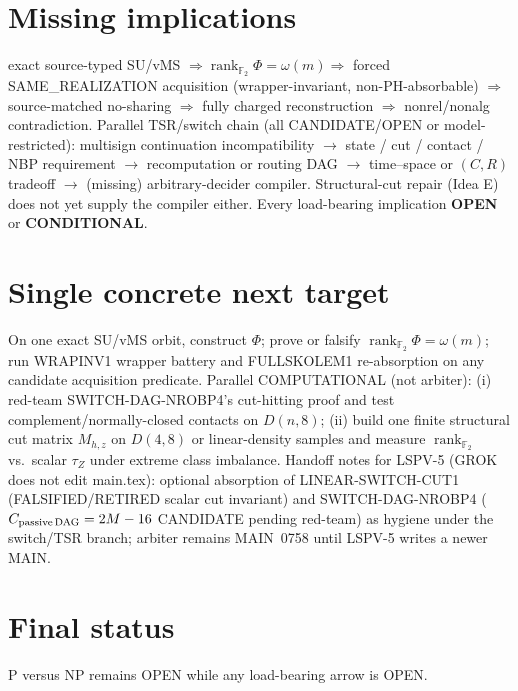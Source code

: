 \documentclass[11pt]{article}
\begin{document}
\section*{Missing implications}
exact source-typed SU/vMS $\Rightarrow\operatorname{rank}_{\mathbb F_2}\Phi=\omega(m)
\Rightarrow$ forced SAME\_REALIZATION acquisition (wrapper-invariant, non-PH-absorbable)
$\Rightarrow$ source-matched no-sharing $\Rightarrow$ fully charged reconstruction
$\Rightarrow$ nonrel/nonalg contradiction.
Parallel TSR/switch chain (all CANDIDATE/OPEN or model-restricted):
multisign continuation incompatibility $\to$ state / cut / contact / NBP requirement
$\to$ recomputation or routing DAG $\to$ time--space or $(C,R)$ tradeoff
$\to$ (missing) arbitrary-decider compiler.
Structural-cut repair (Idea E) does not yet supply the compiler either.
Every load-bearing implication \textbf{OPEN} or \textbf{CONDITIONAL}.

\section*{Single concrete next target}
On one exact SU/vMS orbit, construct $\Phi$; prove or falsify
$\boxed{\operatorname{rank}_{\mathbb F_2}\Phi=\omega(m)}$;
run WRAPINV1 wrapper battery and FULLSKOLEM1 re-absorption on any candidate acquisition predicate.
Parallel COMPUTATIONAL (not arbiter): (i) red-team SWITCH-DAG-NROBP4's cut-hitting proof and
test complement/normally-closed contacts on $D(n,8)$; (ii) build one finite structural cut
matrix $M_{h,z}$ on $D(4,8)$ or linear-density samples and measure $\operatorname{rank}_{\mathbb F_2}$
vs.\ scalar $\tau_Z$ under extreme class imbalance.
Handoff notes for LSPV-5 (GROK does not edit main.tex): optional absorption of
LINEAR-SWITCH-CUT1 (FALSIFIED/RETIRED scalar cut invariant) and SWITCH-DAG-NROBP4
($C_{\rm passive\,DAG}=2M-16$ CANDIDATE pending red-team) as hygiene under the switch/TSR
branch; arbiter remains MAIN~0758 until LSPV-5 writes a newer MAIN.

\section*{Final status}
P versus NP remains OPEN while any load-bearing arrow is OPEN.

\end{document}
